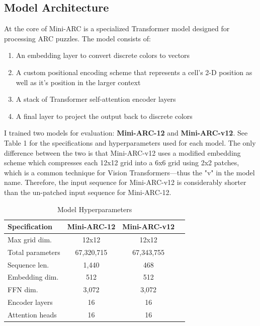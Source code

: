 \documentclass[10pt,twocolumn]{article}
\begin{document}
\subsection{Model Architecture}

At the core of Mini-ARC is a specialized Transformer model designed
for processing ARC puzzles. The model consists of:
\begin{enumerate}
  \item An embedding layer to convert discrete colors to vectors
  \item A custom positional encoding scheme that represents a cell's
    2-D position as well as it's position in the larger context
  \item A stack of Transformer self-attention encoder layers
  \item A final layer to project the output back to discrete colors
\end{enumerate}

I trained two models for evaluation: \textbf{Mini-ARC-12} and
\textbf{Mini-ARC-v12}. See Table 1 for the specifications and
hyperparameters used for each model. The only difference between the
two is that Mini-ARC-v12 uses a modified embedding scheme which
compresses each 12x12 grid into a 6x6 grid using 2x2
patches\cite{dosovitskiy2021imageworth16x16words}, which
is a common technique for Vision Transformers—thus the "v" in the
model name. Therefore, the input sequence for
Mini-ARC-v12 is considerably shorter than the un-patched input
sequence for Mini-ARC-12.

\begin{table}
  \centering
  \caption{Model Hyperparameters}
  \begin{tabular}{lccc}
    \toprule
    \textbf{\footnotesize{Specification}} &
    \textbf{\footnotesize{Mini-ARC-12}} &
    \textbf{\footnotesize{Mini-ARC-v12}} \\
    \midrule
    Max grid dim. & 12x12 & 12x12 \\
    Total parameters & 67,320,715 & 67,343,755  \\
    Sequence len. & 1,440 & 468 \\
    Embedding dim. & 512 & 512  \\
    FFN dim. & 3,072 & 3,072 \\
    Encoder layers & 16 & 16  \\
    Attention heads & 16 & 16 \\
    \bottomrule
  \end{tabular}
  \label{tab:model-specs}
\end{table}
\end{document}
